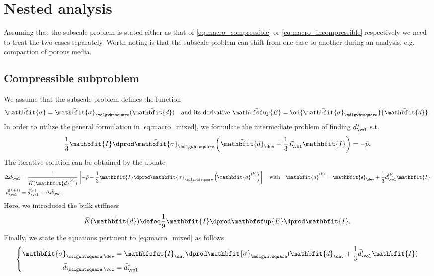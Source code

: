 \documentclass[a4paper,11pt]{article}
\renewcommand{\ts}[1]{\mathbfit{#1}}
\renewcommand{\tf}[1]{\mathbfsfup{#1}}
\renewcommand{\Box}{\mdlgwhtsquare}
\begin{document}
\section{Nested analysis}  \label{sec:nested}
Assuming that the subscale problem is stated either as that of \eqref{eq:macro_compressible} or \eqref{eq:macro_incompressible} respectively we need to treat the two cases separately.
Worth noting is that the subscale problem can shift from one case to another during an analysis, e.g. compaction of porous media.
\subsection{Compressible subproblem} \label{sec:nested_compressible}
We assume that the subscale problem defines the function 
\begin{align}
 \bar{\ts\sigma} = \bar{\ts\sigma}_\Box(\bar{\ts d})\quad \text{and its derivative } \bar{\tf E} = \od{\bar{\ts\sigma}_\Box}{\bar{\ts d}}.
\end{align}
In order to utilize the general formulation in \eqref{eq:macro_mixed}, we formulate the intermediate problem of finding $\bar{d}_\vol^*$ s.t.
\begin{align}
 \frac13 \ts I\dprod \bar{\ts\sigma}_\Box\left(\bar{\ts d}_\dev + \frac13 \bar{d}_\vol^* \ts I\right) = -\bar p.
\end{align}
The iterative solution can be obtained by the update
\begin{align}
 \Delta\bar{d}_\vol &= \frac{1}{\bar K(\bar{\ts d}^{(k)})} \left[-\bar p - \frac13 \ts I\dprod \bar{\ts\sigma}_\Box\left(\bar{\ts d}^{(k)}\right)\right] \quad \text{with}\quad \bar{\ts d}^{(k)} = \bar{\ts d}_\dev + \frac13 \bar{d}_\vol^{(k)} \ts I\\
 \bar{d}_\vol^{(k+1)} &= \bar{d}_\vol^{(k)} + \Delta\bar{d}_\vol
\end{align}
Here, we introduced the bulk stiffness
\begin{align}
  \bar K(\bar{\ts d}) \defeq \frac19  \ts I\dprod \bar{\tf E} \dprod \ts I.
\end{align}
Finally, we state the equations pertinent to \eqref{eq:macro_mixed} as follows
\begin{align}
 \left\{ \begin{aligned}
         \bar{\ts\sigma}_{\Box,\dev} &= \tf I_\dev \dprod \bar{\ts\sigma}_\Box(\bar{\ts d}_\dev + \frac13 \bar{d}_\vol^* \ts I)\\
         \bar{d}_{\Box,\vol} &= \bar{d}_\vol^*
        \end{aligned}
 \right.
\end{align}
\end{document}
